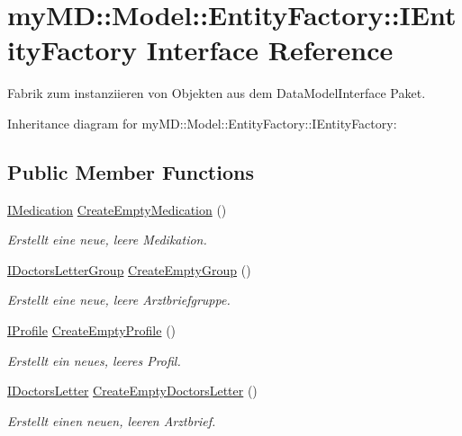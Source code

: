 \hypertarget{interfacemy_m_d_1_1_model_1_1_entity_factory_1_1_i_entity_factory}{
\section{my\-MD::Model::Entity\-Factory::IEntity\-Factory Interface Reference}
\label{d0/d33/interfacemy_m_d_1_1_model_1_1_entity_factory_1_1_i_entity_factory}
}
Fabrik zum instanziieren von Objekten aus dem Data\-Model\-Interface Paket.  


Inheritance diagram for my\-MD::Model::Entity\-Factory::IEntity\-Factory:\subsection*{Public Member Functions}
\begin{CompactItemize}
\item 
\hyperlink{interfacemy_m_d_1_1_model_interface_1_1_data_model_interface_1_1_i_medication}{IMedication} \hyperlink{interfacemy_m_d_1_1_model_1_1_entity_factory_1_1_i_entity_factory_3fd69c99a27372f99eae3cda6e23e2e6}{Create\-Empty\-Medication} ()
\begin{CompactList}\small\item\em Erstellt eine neue, leere Medikation. \item\end{CompactList}\item 
\hyperlink{interfacemy_m_d_1_1_model_interface_1_1_data_model_interface_1_1_i_doctors_letter_group}{IDoctors\-Letter\-Group} \hyperlink{interfacemy_m_d_1_1_model_1_1_entity_factory_1_1_i_entity_factory_7ce2fe6e33d0a78829c47a6b2f35e0fe}{Create\-Empty\-Group} ()
\begin{CompactList}\small\item\em Erstellt eine neue, leere Arztbriefgruppe. \item\end{CompactList}\item 
\hyperlink{interfacemy_m_d_1_1_model_interface_1_1_data_model_interface_1_1_i_profile}{IProfile} \hyperlink{interfacemy_m_d_1_1_model_1_1_entity_factory_1_1_i_entity_factory_d81849285c0ecfe46b822095df995e8e}{Create\-Empty\-Profile} ()
\begin{CompactList}\small\item\em Erstellt ein neues, leeres Profil. \item\end{CompactList}\item 
\hyperlink{interfacemy_m_d_1_1_model_interface_1_1_data_model_interface_1_1_i_doctors_letter}{IDoctors\-Letter} \hyperlink{interfacemy_m_d_1_1_model_1_1_entity_factory_1_1_i_entity_factory_c6e29019778e5a2ab76a6005701f90bd}{Create\-Empty\-Doctors\-Letter} ()
\begin{CompactList}\small\item\em Erstellt einen neuen, leeren Arztbrief. \item\end{CompactList}\end{CompactItemize}


